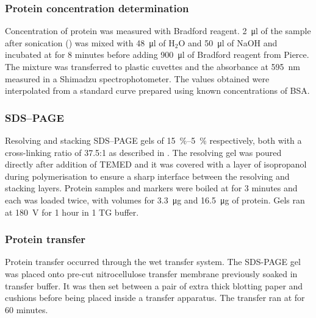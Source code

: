       \subsubsection{Protein concentration determination}
        Concentration of protein was measured with Bradford reagent.
        \SI{2}{\ul} of the sample after sonication ()
        was mixed with \SI{48}{\ul} of H$_2$O and \SI{50}{\ul} of NaOH and
        incubated at  for 8 minutes before adding \SI{900}{\ul} of
        Bradford reagent from Pierce. The mixture was transferred to plastic
        cuvettes and the absorbance at \SI{595}{\nm} measured in a Shimadzu
        spectrophotometer. The values obtained were interpolated from a
        standard curve prepared using known concentrations of BSA.

      \subsubsection{SDS--PAGE}
        Resolving and stacking SDS--PAGE gels of \SIrange{15}{5}{\percent}
        respectively, both with a cross-linking ratio of \num{37.5}:1 as
        described in \citet{harlow_electrophoresis_1988}. The
        resolving gel was poured directly after addition
        of TEMED and it was covered with a layer of isopropanol during polymerisation
        to ensure a sharp interface between the resolving and stacking layers.
        Protein samples and markers were boiled at  for 3 minutes and each
        was loaded twice, with volumes for \SI{3.3}{\ug} and \SI{16.5}{\ug} of
        protein. Gels ran at \SI{180}{\volt} for 1 hour in \SI{1}{\X} TG buffer.

      \subsubsection{Protein transfer}
        Protein transfer occurred through the wet transfer system. The
        SDS-PAGE gel was placed onto pre-cut nitrocellulose transfer membrane
        previously soaked in transfer buffer. It was then set between a pair
        of extra thick blotting paper and cushions before being placed inside
        a transfer apparatus. The transfer ran at  for 60 minutes.

